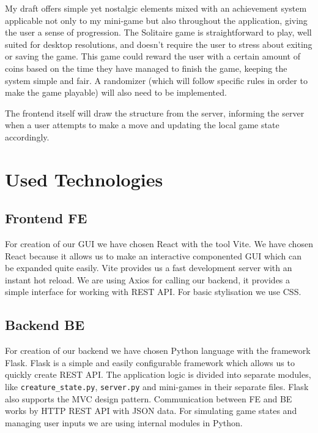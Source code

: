 \documentclass[11pt]{article}
\begin{document}
My draft offers simple yet nostalgic elements mixed with an achievement system applicable not only to my mini-game but also throughout the application, giving the user a sense of progression. 
The Solitaire game is straightforward to play, well suited for desktop resolutions, and doesn't require the user to stress about exiting or saving the game. 
This game could reward the user with a certain amount of coins based on the time they have managed to finish the game, keeping the system simple and fair. 
A randomizer (which will follow specific rules in order to make the game playable) will also need to be implemented. 

The frontend itself will draw the structure from the server, informing the server when a user attempts to make a move and updating the local game state accordingly. 
\newpage

\section{Used Technologies}
\subsection{Frontend FE}
For creation of our GUI we have chosen React with the tool Vite. We have chosen React because it allows us to make an interactive componented GUI which can be expanded quite easily. Vite provides us a fast development server with an instant hot reload. We are using Axios for calling our backend, it provides a simple interface for working with REST API. For basic stylisation we use CSS.
\subsection{Backend BE}
For creation of our backend we have chosen Python language with the framework Flask. Flask is a simple and easily configurable framework which allows us to quickly create REST API. The application logic is divided into separate modules, like \texttt{creature\_state.py}, \texttt{server.py} and mini-games in their separate files. Flask also supports the MVC design pattern. Communication between FE and BE works by HTTP REST API with JSON data. For simulating game states and managing user inputs we are using internal modules in Python.
\end{document}
